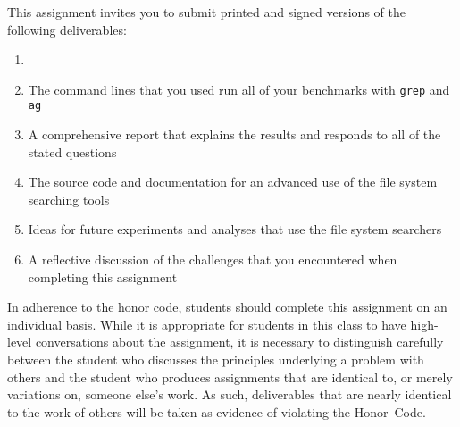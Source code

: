 This assignment invites you to submit printed and signed versions of the following deliverables: 

\begin{enumerate}

  \item 

  \item The command lines that you used run all of your benchmarks with {\tt grep} and {\tt ag} 

  \item A comprehensive report that explains the results and responds to all of the stated questions 

  \item The source code and documentation for an advanced use of the file system searching tools

  \item Ideas for future experiments and analyses that use the file system searchers 

  \item A reflective discussion of the challenges that you encountered when completing this assignment

\end{enumerate}

In adherence to the honor code, students should complete this assignment on an individual basis. While it is appropriate
for students in this class to have high-level conversations about the assignment, it is necessary to distinguish
carefully between the student who discusses the principles underlying a problem with others and the student who produces
assignments that are identical to, or merely variations on, someone else's work.  As such, deliverables that are nearly
identical to the work of others will be taken as evidence of violating the \mbox{Honor Code}.  

  
